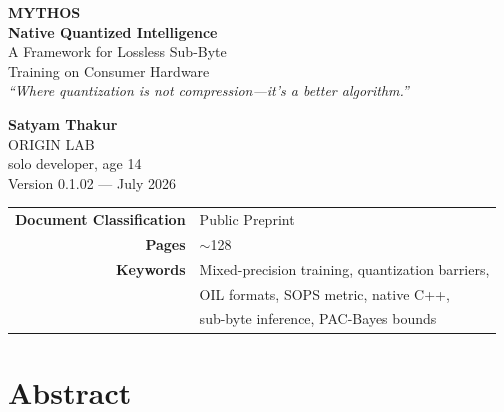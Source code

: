 \documentclass[11pt,a4paper,twoside]{report}
\theoremstyle{definition}
\begin{document}
\begin{titlepage}
\centering
\vspace*{2cm}

{\Huge\bfseries MYTHOS}\\[0.5cm]
{\LARGE\bfseries Native Quantized Intelligence}\\[0.3cm]
{\Large A Framework for Lossless Sub-Byte\\[0.1cm]Training on Consumer Hardware}\\[2cm]

{\large\itshape ``Where quantization is not compression---it's a better algorithm.''}

\vfill


\vfill

{\Large\bfseries Satyam Thakur}\\[0.3cm]
{\large ORIGIN LAB}\\[0.2cm]
{\normalsize solo developer, age 14}\\[1cm]

{\large Version 0.1.02 --- July 2026}

\vfill

{\small
\begin{tabular}{rl}
\toprule
\textbf{Document Classification} & Public Preprint \\
\textbf{Pages} & $\sim$128 \\
\textbf{Keywords} & Mixed-precision training, quantization barriers, \\
& OIL formats, SOPS metric, native C++, \\
& sub-byte inference, PAC-Bayes bounds \\
\bottomrule
\end{tabular}
}

\end{titlepage}

\chapter*{Abstract}
\end{document}
